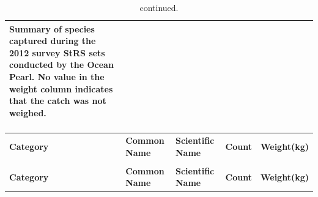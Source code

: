 \documentclass[12pt]{article}\usepackage[]{graphicx}\usepackage[]{color}
\begin{document}
\begingroup\fontsize{8}{10}\selectfont
\begin{longtable}[l]{lllrr}
\caption{\label{tab:table3}Summary of species captured during the 2012 survey StRS sets conducted by the Ocean Pearl. No value in the weight column indicates that the catch was not weighed. ~\\
\hspace*{0.333em}\\}\\
\toprule
\textbf{Category} & \textbf{Common Name} & \textbf{Scientific Name} & \textbf{Count} & \textbf{Weight(kg)}\\
\midrule
\endfirsthead
\caption[]{continued.}\\
\toprule
\textbf{Category} & \textbf{Common Name} & \textbf{Scientific Name} & \textbf{Count} & \textbf{Weight(kg)}\\
\midrule
\endhead


\end{longtable}
\end{document}
